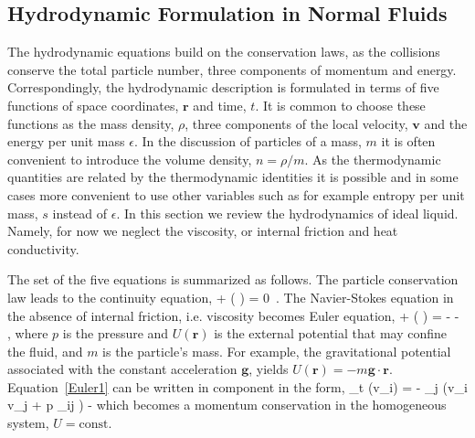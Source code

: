 \subsection{Hydrodynamic Formulation in Normal Fluids}
\label{sec:hydro_normal}
The hydrodynamic equations build on the conservation laws, as the collisions conserve the total particle number, three components of momentum and energy.
Correspondingly, the hydrodynamic description is formulated in terms of  five functions of space coordinates, $\bm{r}$ and time, $t$.
It is common to choose these functions as the 
mass density, $\rho$, three components of the local velocity, $\bm{v}$ and the energy per unit mass $\epsilon$.
In the discussion of particles of a mass, $m$ it is often convenient to introduce the volume density, $n=\rho/m$.
As the thermodynamic quantities are related by the thermodynamic identities it is possible and in some cases more convenient to use other variables such as 
for example entropy per unit mass, $s$ instead of $\epsilon$.
In this section we review the hydrodynamics of ideal liquid.
Namely, for now we neglect the viscosity, or internal friction and heat conductivity.

The set of the five equations is summarized as follows.
The particle conservation law leads to the continuity equation,
\be\label{cont}
 + \bm{\nabla} ( \rho {}) = 0\, .
\ee
The Navier-Stokes equation in the absence of internal friction, i.e. viscosity becomes Euler equation,
\be\label{Euler1}
 + ( \cdot \bm{\nabla})  = -  -  \, ,
\ee 
where $p$ is the pressure and $U(\bm{r})$ is the external potential that may confine the fluid, and $m$ is the particle's mass.
For example, the gravitational potential associated with the constant acceleration $\bm{g}$, yields  $U(\bm{r}) = - m \bm{g} \cdot \bm{r}$.
Equation~\eqref{Euler1} can be written in component in the form,
\be\label{Momentum}
\partial_t (\rho v_i) = - \partial_j (\rho v_{i} v_j + p \delta_{ij} ) -\rho {}
\ee
which becomes a momentum conservation in the homogeneous system, $U=\mathrm{const}$.

